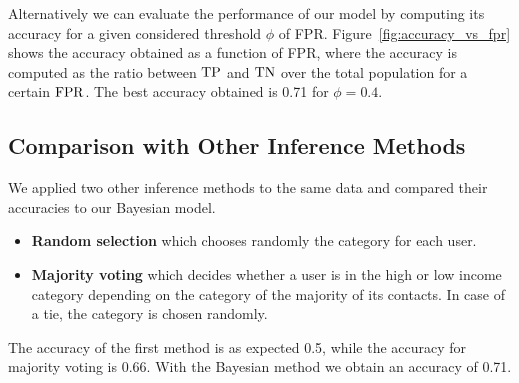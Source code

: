 Alternatively we can evaluate the performance of our model by computing its accuracy for a given considered threshold $\phi$ of FPR. 
Figure~\ref{fig:accuracy_vs_fpr} shows the accuracy obtained as a function of FPR, 
where the accuracy is computed as the ratio between \(\operatorname{TP}\) and \(\operatorname{TN}\) over the total population for a certain \(\operatorname{FPR}\).
The best accuracy obtained is \num{0.71} for $\phi = 0.4$.



\subsection{Comparison with Other Inference Methods}

We applied two other inference methods to the same data and compared their accuracies to our Bayesian model.

\begin{itemize}
	\item \textbf{Random selection} which chooses randomly the category for each user.
	\item \textbf{Majority voting} which decides whether a user is in the high or low income category depending on the category of the majority of its contacts. In case of a tie, the category is chosen randomly.
\end{itemize}

The accuracy of the first method is as expected \num{0.5}, while the accuracy for majority voting is \num{0.66}.
With the Bayesian method we obtain an accuracy of \num{0.71}.




